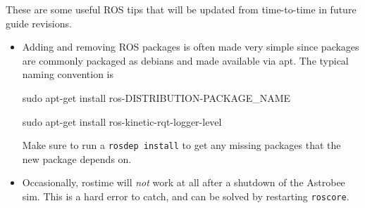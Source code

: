 \documentclass{article}
\begin{document}
These are some useful ROS tips that will be updated from time-to-time in future guide revisions.

\begin{itemize}
    \item Adding and removing ROS packages is often made very simple since packages are commonly packaged as debians and made available via apt. The typical naming convention is \begin{markdown}
	sudo apt-get install ros-DISTRIBUTION-PACKAGE_NAME
	
	sudo apt-get install ros-kinetic-rqt-logger-level
\end{markdown}

Make sure to run a \texttt{rosdep install} to get any missing packages that the new package depends on.

\item Occasionally, rostime will \textit{not} work at all after a shutdown of the Astrobee sim. This is a hard error to catch, and can be solved by restarting \texttt{roscore}.
\end{itemize}

\clearpage
\end{document}
